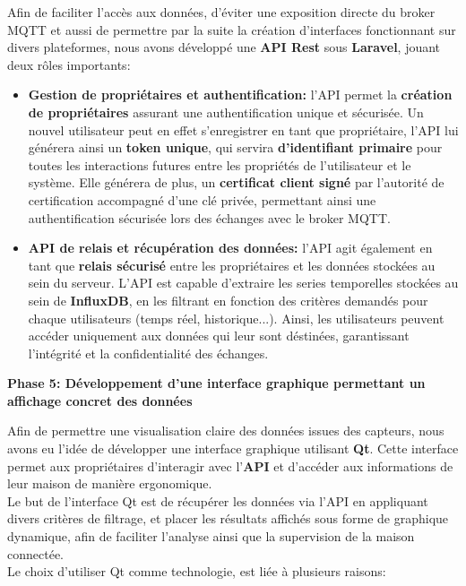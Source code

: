 \documentclass[10pt, a4paper]{report}
\begin{document}
	Afin de faciliter l'accès aux données, d'éviter une exposition directe du broker MQTT et aussi de permettre par la suite la création d'interfaces fonctionnant sur divers plateformes, nous avons développé une \textbf{API Rest} sous \textbf{Laravel}, jouant deux rôles importants:
	
	\begin{itemize}
		\item \textbf{Gestion de propriétaires et authentification:} l'API permet la \textbf{création de propriétaires} assurant une authentification unique et sécurisée. Un nouvel utilisateur peut en effet s'enregistrer en tant que propriétaire, l'API lui générera ainsi un \textbf{token unique}, qui servira \textbf{d'identifiant primaire} pour toutes les interactions futures entre les propriétés de l'utilisateur et le système. Elle générera de plus, un \textbf{certificat client signé} par l'autorité de certification accompagné d'une clé privée, permettant ainsi une authentification sécurisée lors des échanges avec le broker MQTT.
		
		\item \textbf{API de relais et récupération des données: } l'API agit également en tant que \textbf{relais sécurisé} entre les propriétaires et les données stockées au sein du serveur. L'API est capable d'extraire les series temporelles stockées au sein de \textbf{InfluxDB}, en les filtrant en fonction des critères demandés pour chaque utilisateurs (temps réel, historique...). Ainsi, les utilisateurs peuvent accéder uniquement aux données qui leur sont déstinées, garantissant l'intégrité et la confidentialité des échanges.\\
	\end{itemize}
	 
	
	\textbf{Phase 5: Développement d'une interface graphique  permettant un affichage concret des données}
	
	Afin de permettre une visualisation claire des données issues des capteurs, nous avons eu l'idée de développer une interface graphique utilisant \textbf{Qt}. Cette interface permet aux propriétaires d'interagir avec l'\textbf{API}
	et d'accéder aux informations de leur maison de manière ergonomique.\\
	Le but de l'interface Qt est de récupérer les données via l'API en appliquant divers critères de filtrage, et placer les résultats affichés sous forme de graphique dynamique, afin de faciliter l'analyse ainsi que la supervision de la maison connectée.\\
	Le choix d'utiliser Qt comme technologie, est liée à plusieurs raisons:
	
\end{document}

